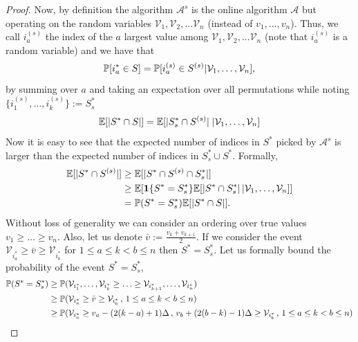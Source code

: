 \begin{proof}
Now, by definition the algorithm $\mathcal{A}^{s}$ is the online algorithm $\mathcal{A}$ but operating on the random variables $\mathcal{V}_1, \mathcal{V}_2, ...\mathcal{V}_n$ (instead of $v_1,\ldots, v_n$). Thus, we call $i_a^{(s)}$ the index of the $a$ largest value among  $\mathcal{V}_1, \mathcal{V}_2, ...\mathcal{V}_n$ (note that $i_a^{(s)}$ is a random variable) and we have that 
\begin{equation}
   {\mathbb{P}}[i_a^* \in S] = {\mathbb{P}}[i_a^{(s)} \in S^{(s)}|\mathcal{V}_1, \dots,\mathcal{V}_n],
\end{equation}
by summing over $a$ and taking an expectation over all permutations while noting $\{i_1^{(s)},\ldots,i_k^{(s)}\} := S^*_s$
\begin{equation}
    {\mathbb{E}}[|S^* \cap S|] = {\mathbb{E}}[|S^*_s \cap S^{(s)}|  \; | \mathcal{V}_1, \ldots,\mathcal{V}_n]
\end{equation}
Now it is easy to see that the expected number of indices in $S^*$ picked by $\mathcal{A}^{s}$ is larger than the expected number of indices in $S^*_s\cup S^*$. Formally,
\begin{align}
    {\mathbb{E}}[|S^* \cap S^{(s)}|]  \notag
    &\geq {\mathbb{E}}[|S^* \cap S^{(s)} \cap S^*_s|] \notag \\
    &\geq {\mathbb{E}} [ \mathbf{1}\{S^* = S^*_s\} {\mathbb{E}}[|S^* \cap S^*_s|\,| \mathcal{V}_1, \ldots,\mathcal{V}_n]] \notag\\
    &= {\mathbb{P}}(S^*=S^*_s) {\mathbb{E}}[|S^* \cap S|].
\end{align}
Without loss of generality we can consider an ordering over true values $v_1 \geq \dots \geq v_n$. Also, let us denote $\bar v:= \frac{v_k + v_{k+1}}{2}$. If we consider the event $\mathcal{V}_{i_a^*} \geq \bar v \geq \mathcal{V}_{i_b^*}$ for $1 \leq a \leq k < b \leq n$ then $S^*=S^*_s$. Let us formally bound the probability of the event  $S^*=S^*_s$,
\begin{align*}
    \sP(S^*=S^*_s) 
    &\geq \sP(\mathcal{V}_{i_1^*}, \ldots, \mathcal{V}_{i_k^*} \geq \ldots \geq \mathcal{V}_{i_{k+1}^*} , \ldots, \mathcal{V}_{i_n^*})  \\
     & \geq \sP(\mathcal{V}_{i_a^*} \geq \bar v \geq \mathcal{V}_{i_b^*}\,,\,1 \leq a \leq k < b \leq n) \\
    & \geq \sP(\mathcal{V}_{i_a^*} \geq v_a - (2(k-a)+1)\Delta\,,\,   v_b + (2(b-k)-1) \Delta \geq  \mathcal{V}_{i_b^*}\,,\,1 \leq a \leq k < b \leq n) \\

\end{align*}
\end{proof}
